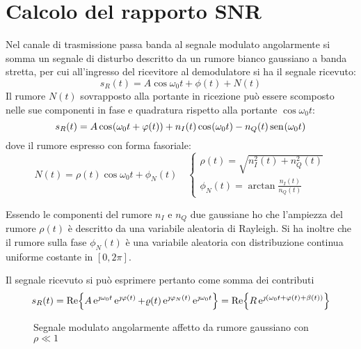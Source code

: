 \section{Calcolo del rapporto \ac{SNR}}
Nel canale di trasmissione passa banda al segnale modulato angolarmente si somma un segnale di disturbo descritto da un rumore bianco gaussiano a banda stretta, per cui all'ingresso del ricevitore al demodulatore si ha il segnale ricevuto:
\begin{equation}
s_R(t)=A\cos{\omega_0 t+\phi(t)}+N(t)
\end{equation}
Il rumore $N(t)$ sovrapposto alla portante in ricezione può essere scomposto nelle sue componenti in fase e quadratura rispetto alla portante $\cos{\omega_0 t}$:
\begin{equation}
s_R(t)=A\,{\operatorname{cos}}^{}\!\left({\omega_0 t+\varphi(t)}\right)+n_I(t)\,{\operatorname{cos}}^{}\!\left({\omega_0 t}\right)-n_Q(t)\,{\operatorname{sen}}^{}\!\left({\omega_0 t}\right)
\end{equation}
dove il rumore espresso con forma fasoriale:
\begin{equation}
N(t)=\rho(t)\cos{\omega_0 t+\phi_N(t)}\quad\begin{cases}
\rho(t)=\sqrt{n_I^2(t)+n_Q^2(t)}\\\phi_N(t)=\arctan\frac{n_I(t)}{n_Q(t)}\end{cases}
\end{equation}

Essendo le componenti del rumore $n_I$ e $n_Q$ due gaussiane ho che l'ampiezza del rumore $\rho(t)$ è descritto da una variabile aleatoria di Rayleigh.
Si ha inoltre che il rumore sulla fase $\phi_N(t)$ è una variabile aleatoria con distribuzione continua uniforme costante in $[0,2\pi]$.

Il segnale ricevuto si può esprimere pertanto come somma dei contributi
\begin{equation}
s_R(t)=\operatorname{Re}\!\left\lbrace{A\operatorname{e}^{\jmath\omega_0 t}\operatorname{e}^{\jmath\varphi(t)}+\varrho(t)\operatorname{e}^{\jmath\varphi_N(t)}\operatorname{e}^{\jmath\omega_0 t}}\right\rbrace=\operatorname{Re}\!\left\lbrace{R\operatorname{e}^{\jmath(\omega_0 t+\varphi(t)+\beta(t))}}\right\rbrace
\end{equation}
\begin{figure}[!ht]\centering
{}
\caption{Segnale modulato angolarmente affetto da rumore gaussiano con $\rho\ll 1$}\label{fig:segnale_modulato_angolarmente_affetto_da_rumore}
\end{figure}

